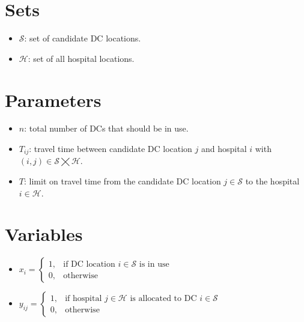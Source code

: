 \documentclass{article}
\begin{document}
\section{Sets}
\begin{itemize}[leftmargin=*,nosep]
    \item $\mathcal{S}$: set of candidate DC locations.
    \item $\mathcal{H}$: set of all hospital locations.
\end{itemize}

\section{Parameters}
\begin{itemize}[leftmargin=*,nosep]
    \item $n$: total number of DCs that should be in use.
    \item     $T_{ij}$: travel time between candidate DC location $j $ and hospital $i$ with $(i, j) \in  \mathcal{S} \bigtimes \mathcal{H}$.
    \item $T$: limit on travel time from the candidate DC location $j \in \mathcal{S}$ to the hospital $i \in \mathcal{H}$.
\end{itemize}

\section{Variables}
\begin{itemize}[leftmargin=*,nosep]
    \item $x_i = \begin{cases} 
        1, & \text{if DC location } i \in \mathcal{S} \text{ is in use} \\ 
        0, & \text{otherwise} 
    \end{cases}$
    \item $y_{ij} = \begin{cases} 
        1, & \text{if hospital } j \in \mathcal{H} \text{ is allocated to DC } i \in \mathcal{S} \\ 
        0, & \text{otherwise} 
    \end{cases}$
\end{itemize}
\end{document}
